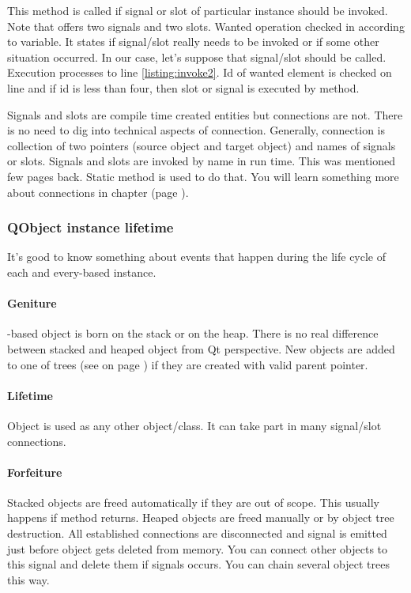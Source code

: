 This method is called if signal or slot of particular instance should be invoked. Note that offers two signals and two slots. Wanted operation checked in according to variable. It states if signal/slot really needs to be invoked or if some other situation occurred. In our case, let's suppose that signal/slot should be called. Execution processes to line \ref{listing:invoke2}. Id of wanted element is checked on line and if id is less than four, then slot or signal is executed by method.

Signals and slots are compile time created entities but connections are not. There is no need to dig into technical aspects of connection. Generally, connection is collection of two pointers (source object and target object) and names of signals or slots. Signals and slots are invoked by name in run time. This was mentioned few pages back. Static method is used to do that. \citep[QMetaObject class]{various:qtdoc}  You will learn something more about connections in chapter  (page \pageref{section:thread}).



\subsubsection{QObject instance lifetime}
It's good to know something about events that happen during the life cycle of each and every-based instance.

\paragraph*{Geniture}
-based object is born on the stack or on the heap. There is no real difference between stacked and heaped object from Qt perspective. New objects are added to one of trees (see  on page \pageref{section:model}) if they are created with valid parent pointer.

\paragraph*{Lifetime}
Object is used as any other \cpp object/class. It can take part in many signal/slot connections.

\paragraph*{Forfeiture}
Stacked objects are freed automatically if they are out of scope. This usually happens if method returns. Heaped objects are freed manually or by object tree destruction. All established connections are disconnected and signal is emitted just before object gets deleted from memory. You can connect other objects to this signal and delete them if signals occurs. You can chain several object trees this way.